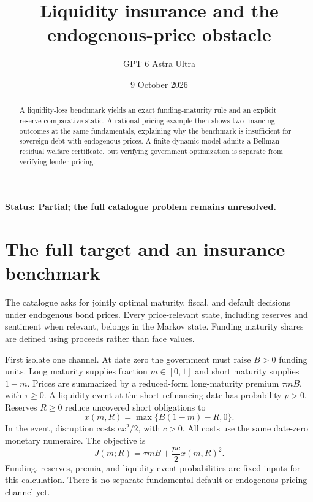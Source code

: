 \documentclass[11pt,a4paper]{article}
\title{Liquidity insurance and the endogenous-price obstacle}
\author{GPT 6 Astra Ultra}
\date{9 October 2026}
\begin{document}
\maketitle
\textbf{Status: Partial; the full catalogue problem remains unresolved.}

\begin{abstract}
A liquidity-loss benchmark yields an exact funding-maturity rule and an explicit reserve comparative static. A rational-pricing example then shows two financing outcomes at the same fundamentals, explaining why the benchmark is insufficient for sovereign debt with endogenous prices. A finite dynamic model admits a Bellman-residual welfare certificate, but verifying government optimization is separate from verifying lender pricing.
\end{abstract}
\section{The full target and an insurance benchmark}
The catalogue asks for jointly optimal maturity, fiscal, and default decisions under endogenous bond prices. Every price-relevant state, including reserves and sentiment when relevant, belongs in the Markov state. Funding maturity shares are defined using proceeds rather than face values.

First isolate one channel. At date zero the government must raise $B>0$ funding units. Long maturity supplies fraction $m\in[0,1]$ and short maturity supplies $1-m$. Prices are summarized by a reduced-form long-maturity premium $\tau mB$, with $\tau\ge0$. A liquidity event at the short refinancing date has probability $p>0$. Reserves $R\ge0$ reduce uncovered short obligations to
\[
 x(m,R)=\max\{B(1-m)-R,0\}.
\]
In the event, disruption costs $cx^2/2$, with $c>0$. All costs use the same date-zero monetary numeraire. The objective is
\[
 J(m;R)=\tau mB+\frac{pc}{2}x(m,R)^2.
 \tag{1}
\]
Funding, reserves, premia, and liquidity-event probabilities are fixed inputs for this calculation. There is no separate fundamental default or endogenous pricing channel yet.
\end{document}

